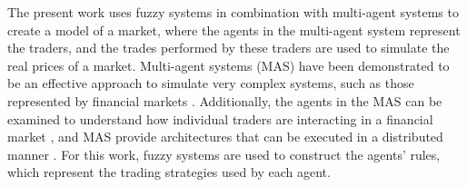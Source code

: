 \documentclass{ieeeaccess}
\begin{document}
The present work uses fuzzy systems in combination with multi-agent
systems to create a model of a market, where the agents in the
multi-agent system represent the traders, and the trades performed by
these traders are used to simulate the real prices of a market.
Multi-agent systems (MAS) have been demonstrated to be an effective
approach to simulate very complex systems, such as those represented
by financial markets \cite{Lebaron2001} \cite{Grothmann2002}
\cite{Li2014} \cite{Chen2004} \cite{Kim2018}. Additionally, the agents
in the MAS can be examined to understand how individual traders are
interacting in a financial market \cite{Wei2014} \cite{Rajab2019}, and
MAS provide architectures that can be executed in a distributed manner
\cite{Gao2019} \cite{Yu2015} \cite{Yu2015}. For this work, fuzzy
systems are used to construct the agents' rules, which represent the
trading strategies used by each agent.


\end{document}
